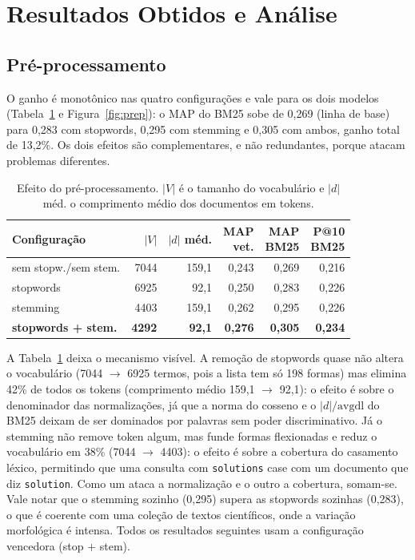 \documentclass[10pt,twocolumn,a4paper]{article}
\begin{document}
\section{Resultados Obtidos e Análise}

\subsection{Pré-processamento}
\label{sec:prep}

O ganho é monotônico nas quatro configurações e vale para os dois modelos
(Tabela~\ref{tab:prep} e Figura~\ref{fig:prep}): o MAP do BM25 sobe de 0,269
(linha de base) para 0,283 com stopwords, 0,295 com stemming e 0,305 com ambos,
ganho total de 13,2\%. Os dois efeitos são complementares, e não redundantes,
porque atacam problemas diferentes.

\begin{table}[htbp]
\centering
\scriptsize
\setlength{\tabcolsep}{3.5pt}
\renewcommand{\cellalign}{bc}
\begin{tabular}{@{}lrrrrr@{}}
\toprule
\textbf{Configuração} & \textbf{$|V|$} & \makecell{\textbf{$|d|$}\\\textbf{méd.}} &
\makecell{\textbf{MAP}\\\textbf{vet.}} & \makecell{\textbf{MAP}\\\textbf{BM25}} &
\makecell{\textbf{P@10}\\\textbf{BM25}}\\
\midrule
sem stopw./sem stem. & 7044 & 159,1 & 0,243 & 0,269 & 0,216\\
stopwords            & 6925 &  92,1 & 0,250 & 0,283 & 0,226\\
stemming             & 4403 & 159,1 & 0,262 & 0,295 & 0,226\\
\textbf{stopwords + stem.} & \textbf{4292} & \textbf{92,1} &
\textbf{0,276} & \textbf{0,305} & \textbf{0,234}\\
\bottomrule
\end{tabular}
\caption{Efeito do pré-processamento. $|V|$ é o tamanho do vocabulário e
$|d|$ méd. o comprimento médio dos documentos em tokens.}
\label{tab:prep}
\end{table}

A Tabela~\ref{tab:prep} deixa o mecanismo visível. A remoção de stopwords quase não altera o
vocabulário (7044 $\to$ 6925 termos, pois a lista tem só 198 formas) mas elimina
42\% de todos os tokens (comprimento médio 159,1 $\to$ 92,1): o efeito é sobre o
denominador das normalizações, já que a norma do cosseno e o
$|d|/\mathrm{avgdl}$ do BM25 deixam de ser dominados por palavras sem poder
discriminativo. Já o stemming não remove token algum, mas funde formas
flexionadas e reduz o vocabulário em 38\% (7044 $\to$ 4403): o efeito é sobre a
cobertura do casamento léxico, permitindo que uma consulta com
\texttt{solutions} case com um documento que diz \texttt{solution}. Como um ataca
a normalização e o outro a cobertura, somam-se. Vale notar que o stemming
sozinho (0,295) supera as stopwords sozinhas (0,283), o que é coerente com uma
coleção de textos científicos, onde a variação morfológica é intensa. Todos os
resultados seguintes usam a configuração vencedora (stop + stem).
\end{document}

